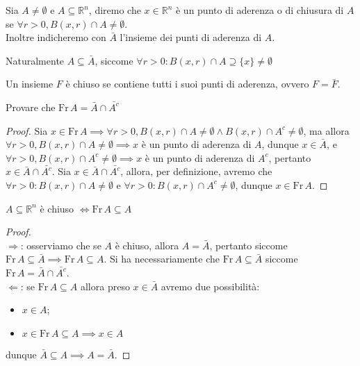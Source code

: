 \begin{definition}
	Sia $A \neq \emptyset$ e $A \subseteq \mathbb{R}^n$, diremo che $x \in \mathbb{R}^n$ è un punto di aderenza o di chiusura di $A$ se $\forall r > 0, B(x, r) \cap A \neq \emptyset$. \\
	Inoltre indicheremo con $\bar{A}$ l'insieme dei punti di aderenza di $A$.
\end{definition}
\begin{remark}
	Naturalmente $A \subseteq \bar{A}$, siccome $\forall r > 0: B(x, r) \cap A \supseteq \{ x \} \neq \emptyset$
\end{remark}
\begin{definition}
	Un insieme $F$ è chiuso se contiene tutti i suoi punti di aderenza, ovvero $F = \bar{F}$.
\end{definition}
\begin{exercise}
	Provare che $\text{Fr} \, A = \bar{A} \cap \bar{A^c}$
\end{exercise}
\begin{proof}
	Sia $x \in \text{Fr} \, A \implies \forall r > 0, B(x, r) \cap A \neq \emptyset \wedge B(x, r) \cap A^c \neq \emptyset$, ma allora $\forall r > 0, B(x, r) \cap A \neq \emptyset \implies x$ è un punto di aderenza di $A$, dunque $x \in \bar{A}$, e $\forall r > 0, B(x, r) \cap A^c \neq \emptyset \implies x$ è un punto
	di aderenza di $A^c$, pertanto $x \in \bar{A} \cap \bar{A^c}$. Sia $x \in \bar{A} \cap \bar{A^c}$, allora, per definizione, avremo che $\forall r > 0: B(x, r) \cap A \neq \emptyset$ e $\forall r > 0: B(x, r) \cap A^c \neq \emptyset$, dunque $x \in \text{Fr} \, A$.
\end{proof}
\begin{exercise}
	$A \subseteq \mathbb{R}^n$ è chiuso $\iff \text{Fr} \, A \subseteq A$
\end{exercise}
\begin{proof} \hspace{1cm} \\
	$\boxed{\Rightarrow}$: osserviamo che se $A$ è chiuso, allora $A = \bar{A}$, pertanto siccome $\text{Fr} \, A \subseteq \bar{A} \implies \text{Fr} \, A \subseteq A$. Si ha necessariamente che $\text{Fr} \, A \subseteq \bar{A}$ siccome $\text{Fr} \, A = \bar{A} \cap \bar{A^c}$. \\
	$\boxed{\Leftarrow}$: se $\text{Fr} \, A \subseteq A$ allora preso $x \in \bar{A}$ avremo due possibilità:
	\begin{itemize}
		\item $x \in A$;
		\item $x \in \text{Fr} \, A \subseteq A \implies x \in A$
	\end{itemize}
	dunque $\bar{A} \subseteq A \implies A = \bar{A}$.
\end{proof}
